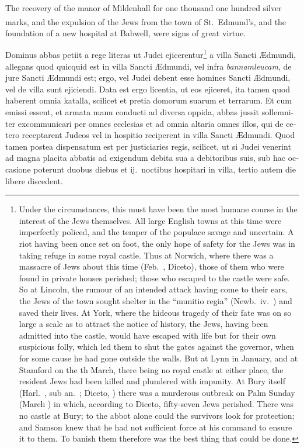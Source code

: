 \documentclass{book}
\newcounter{engnote}
\newcommand{\engnotenum}{\textsuperscript{\arabic{engnote}\stepcounter{engnote}}}
\begin{document}
\begin{paracol}{2}
\begin{otherlanguage}{latin}
\end{otherlanguage}

\switchcolumn

The recovery of the manor of Mildenhall for one thousand one hundred silver marks, and the expulsion of the Jews\engnotenum{} from the town of St.\ Edmund's, and the foundation of a new hospital at Babwell, were signs of great virtue.

\switchcolumn*

\begin{otherlanguage}{latin}
Dominus abbas petiit a rege literas ut Judei
ejicerentur\footnote[\textdagger]{Under the circumstances, this must have been the most humane course in the interest of the Jews themselves. All large English towns at this time were imperfectly policed, and the temper of the populace savage and uncertain. A riot having been once set on foot, the only hope of safety for the Jews was in taking refuge in some royal castle. Thus at Norwich, where there was a massacre of Jews about this time (Feb.\ , Diceto), those of them who were found in private houses perished; those who escaped to the castle were safe. So at Lincoln, the rumour of an intended attack having come to their ears, the Jews of the town sought shelter in the ``munitio regia'' (Newb.\ iv.\ ) and saved their lives. At York, where the hideous tragedy of their fate was on so large a scale as to attract the notice of history, the Jews, having been admitted into the castle, would have escaped with life but for their own suspicious folly, which led them to shut the gates against the governor, when for some cause he had gone outside the walls. But at Lynn in January, and at Stamford on the th March, there being no royal castle at either place, the resident Jews had been killed and plundered with impunity. At Bury itself (Harl.\ , sub an.\ ; Diceto, ) there was a murderous outbreak on Palm Sunday (March ) in which, according to Diceto, fifty-seven Jews perished. There was no castle at Bury; to the abbot alone could the survivors look for protection; and Samson knew that he had not sufficient force at his command to ensure it to them. To banish them therefore was the best thing that could be done.} a villa Sancti \AE{}dmundi, allegans quod
quicquid est in villa Sancti \AE{}dmundi, vel infra \emph{bannamleucam}, de jure Sancti \AE{}dmundi est; ergo, vel Judei debent esse homines Sancti \AE{}dmundi, vel de villa sunt ejiciendi. Data est ergo licentia, ut eos ejiceret, ita tamen quod haberent omnia katalla, scilicet et pretia domorum suarum et terrarum. Et cum emissi essent, et armata manu conducti ad diversa oppida, abbas jussit sollemniter excommunicari per omnes ecclesias et ad omnia altaria omnes illos, qui de cetero receptarent Judeos vel in hospitio reciperent in villa Sancti \AE{}dmundi. Quod tamen postea dispensatum est per justiciaries regis, scilicet, ut si Judei venerint ad magna placita abbatis ad exigendum debita sua a debitoribus suis, sub hac occasione poterunt duobus diebus et ij.\ noctibus hospitari in villa, tertio autem die libere discedent.
\end{otherlanguage}


\end{paracol}
\end{document}
